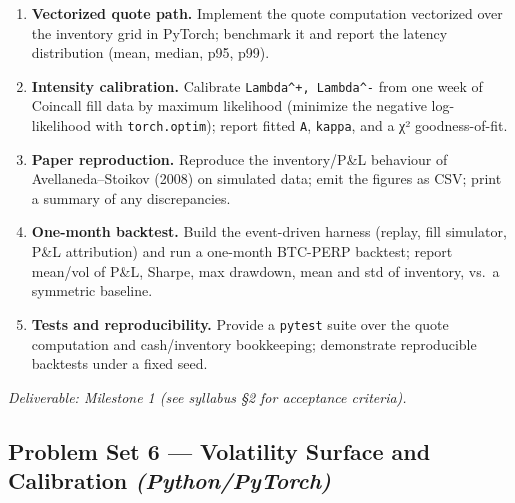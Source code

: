 \documentclass[
]{article}
\providecommand{\tightlist}{%
  \setlength{\itemsep}{0pt}\setlength{\parskip}{0pt}}
\begin{document}
\begin{enumerate}
\def\labelenumi{\arabic{enumi}.}
\tightlist
\item
  \textbf{Vectorized quote path.} Implement the quote computation
  vectorized over the inventory grid in PyTorch; benchmark it and report
  the latency distribution (mean, median, p95, p99).
\item
  \textbf{Intensity calibration.} Calibrate
  \texttt{Lambda\^{}+,\ Lambda\^{}-} from one week of Coincall fill data
  by maximum likelihood (minimize the negative log-likelihood with
  \texttt{torch.optim}); report fitted \texttt{A}, \texttt{kappa}, and a
  χ² goodness-of-fit.
\item
  \textbf{Paper reproduction.} Reproduce the inventory/P\&L behaviour of
  Avellaneda--Stoikov (2008) on simulated data; emit the figures as CSV;
  print a summary of any discrepancies.
\item
  \textbf{One-month backtest.} Build the event-driven harness (replay,
  fill simulator, P\&L attribution) and run a one-month BTC-PERP
  backtest; report mean/vol of P\&L, Sharpe, max drawdown, mean and std
  of inventory, vs.~a symmetric baseline.
\item
  \textbf{Tests and reproducibility.} Provide a \texttt{pytest} suite
  over the quote computation and cash/inventory bookkeeping; demonstrate
  reproducible backtests under a fixed seed.
\end{enumerate}

\emph{Deliverable: Milestone 1 (see syllabus §2 for acceptance
criteria).}

\subsection{\texorpdfstring{Problem Set 6 --- Volatility Surface and
Calibration
\emph{(Python/PyTorch)}}{Problem Set 6 --- Volatility Surface and Calibration (Python/PyTorch)}}\label{problem-set-6-volatility-surface-and-calibration-pythonpytorch}
\end{document}
